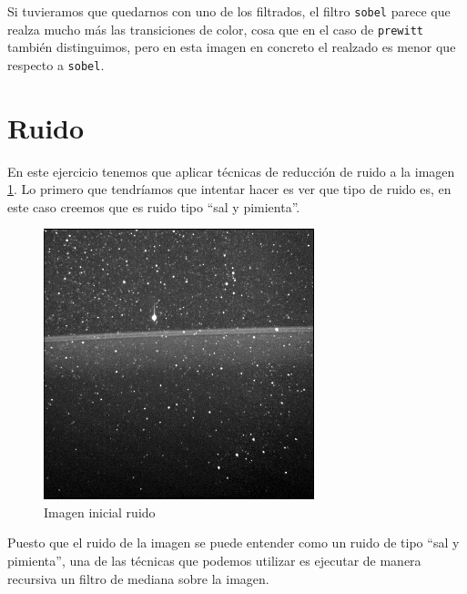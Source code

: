\documentclass[12pt]{article}
\begin{document}
	\noindent Si tuvieramos que quedarnos con uno de los filtrados, el filtro \texttt{sobel} parece que realza mucho más las transiciones de color, cosa que en el caso de \texttt{prewitt} también distinguimos, pero en esta imagen en concreto el realzado es menor que respecto a \texttt{sobel}.
	
	\pagebreak
	
	\section{Ruido}
	
	\noindent En este ejercicio tenemos que aplicar técnicas de reducción de ruido a la imagen \ref{img: ruido src}. Lo primero que tendríamos que intentar hacer es ver que tipo de ruido es, en este caso creemos que es ruido tipo ``sal y pimienta''.
	
	\begin{figure}[h]
		\begin{center}
			\includegraphics[width=0.7\textwidth]{img/ruido.jpg}
			\caption{Imagen inicial ruido}
			\label{img: ruido src}
		\end{center}
	\end{figure}
	
	\noindent Puesto que el ruido de la imagen se puede entender como un ruido de tipo ``sal y pimienta'', una de las técnicas que podemos utilizar es ejecutar de manera recursiva un filtro de mediana sobre la imagen.
	
\end{document}
